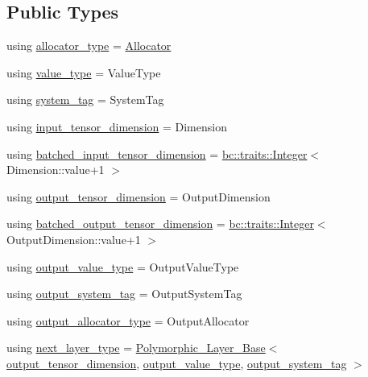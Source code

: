 \subsection*{Public Types}
\begin{DoxyCompactItemize}
\item 
using \hyperlink{structbc_1_1nn_1_1Polymorphic__Layer__Base_a1414f8c37dea6254aebf63e4486ed818}{allocator\+\_\+type} = \hyperlink{classbc_1_1allocators_1_1Allocator}{Allocator}
\item 
using \hyperlink{structbc_1_1nn_1_1Polymorphic__Layer__Base_aa7d46845ee0a4544003a6f8fe3b7f52a}{value\+\_\+type} = Value\+Type
\item 
using \hyperlink{structbc_1_1nn_1_1Polymorphic__Layer__Base_a038901ff126b59392a45ffb2d839b3b0}{system\+\_\+tag} = System\+Tag
\item 
using \hyperlink{structbc_1_1nn_1_1Polymorphic__Layer__Base_a9cf367e8f043b3bc7ac8ce8f5aeaa832}{input\+\_\+tensor\+\_\+dimension} = Dimension
\item 
using \hyperlink{structbc_1_1nn_1_1Polymorphic__Layer__Base_a5ad2ab7a9e1bef167adba39b581bdeac}{batched\+\_\+input\+\_\+tensor\+\_\+dimension} = \hyperlink{structbc_1_1traits_1_1Integer}{bc\+::traits\+::\+Integer}$<$ Dimension\+::value+1 $>$
\item 
using \hyperlink{structbc_1_1nn_1_1Polymorphic__Layer__Base_a099ec870d177606464f40dfb496d31a2}{output\+\_\+tensor\+\_\+dimension} = Output\+Dimension
\item 
using \hyperlink{structbc_1_1nn_1_1Polymorphic__Layer__Base_a012247fd372f38d7156bda51bdd74a70}{batched\+\_\+output\+\_\+tensor\+\_\+dimension} = \hyperlink{structbc_1_1traits_1_1Integer}{bc\+::traits\+::\+Integer}$<$ Output\+Dimension\+::value+1 $>$
\item 
using \hyperlink{structbc_1_1nn_1_1Polymorphic__Layer__Base_a15d1092569f56625cbdf8d7045e66391}{output\+\_\+value\+\_\+type} = Output\+Value\+Type
\item 
using \hyperlink{structbc_1_1nn_1_1Polymorphic__Layer__Base_aeb60d2b5eb18d542fecd5a34fc122bf0}{output\+\_\+system\+\_\+tag} = Output\+System\+Tag
\item 
using \hyperlink{structbc_1_1nn_1_1Polymorphic__Layer__Base_a4bc904c1787b9da18e35d0c6b60ac59f}{output\+\_\+allocator\+\_\+type} = Output\+Allocator
\item 
using \hyperlink{structbc_1_1nn_1_1Polymorphic__Layer__Base_ac7d70db83e8370d2975d05401713f677}{next\+\_\+layer\+\_\+type} = \hyperlink{structbc_1_1nn_1_1Polymorphic__Layer__Base}{Polymorphic\+\_\+\+Layer\+\_\+\+Base}$<$ \hyperlink{structbc_1_1nn_1_1Polymorphic__Layer__Base_a099ec870d177606464f40dfb496d31a2}{output\+\_\+tensor\+\_\+dimension}, \hyperlink{structbc_1_1nn_1_1Polymorphic__Layer__Base_a15d1092569f56625cbdf8d7045e66391}{output\+\_\+value\+\_\+type}, \hyperlink{structbc_1_1nn_1_1Polymorphic__Layer__Base_aeb60d2b5eb18d542fecd5a34fc122bf0}{output\+\_\+system\+\_\+tag} $>$

\end{DoxyCompactItemize}

